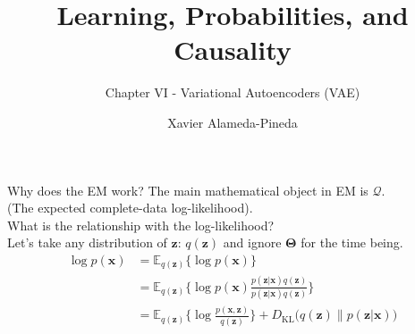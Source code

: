 \documentclass{beamer}
\title[LPC]{Learning, Probabilities, and Causality}
\subtitle{Chapter VI - Variational Autoencoders (VAE)} %
\author[Xavi]{Xavier Alameda-Pineda}
\institute{}
\date{}
\newcommand{\bs}[1]{\boldsymbol{#1}}
\begin{document}
\begin{frame}
    \titlepage
    \vspace{-1.9cm}
\end{frame}

% 

\begin{frame}{Why does the EM work?}
 The main mathematical object in EM is $\mathcal{Q}$.\\ {\footnotesize (The expected complete-data log-likelihood).}\vspace{4mm}\\
 
 What is the relationship with the log-likelihood?\\ Let's take any distribution of $\bs{z}$: $q(\bs{z})$ and ignore $\bs{\Theta}$ for the time being.
 \begin{align}
\log p(\bs{x})&= \mathbb{E}_{q(\bs{z})}\Big\{\log p(\bs{x})\Big\}\\
&= \mathbb{E}_{q(\bs{z})}\Big\{\log p(\bs{x})\frac{p(\bs{z}|\bs{x})q(\bs{z})}{p(\bs{z}|\bs{x})q(\bs{z})}\Big\}\\
&= \mathbb{E}_{q(\bs{z})}\Big\{\log \frac{p(\bs{x},\bs{z})}{q(\bs{z})}\Big\} +  D_{\text{KL}}\Big(q(\bs{z})\Big\lVert p(\bs{z}|\bs{x})\Big)
\end{align}
\end{frame}
\end{document}
